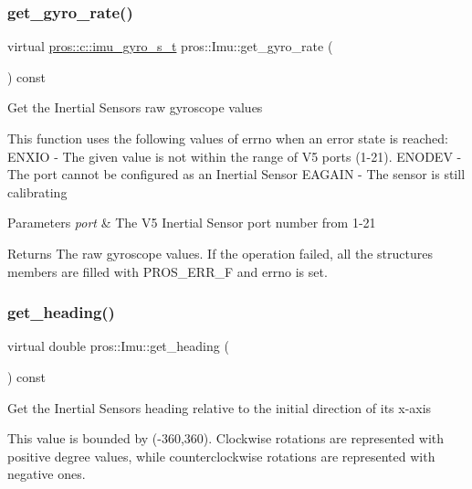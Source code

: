 \subsubsection{\texorpdfstring{get\+\_\+gyro\+\_\+rate()}{get\_gyro\_rate()}}
{\footnotesize\ttfamily virtual \hyperlink{imu_8h_a5b9e240cfb181cce3c741e29efbbbf23}{pros\+::c\+::imu\+\_\+gyro\+\_\+s\+\_\+t} pros\+::\+Imu\+::get\+\_\+gyro\+\_\+rate (\begin{DoxyParamCaption}{ }\end{DoxyParamCaption}) const\hspace{0.3cm}{\ttfamily [virtual]}}

Get the Inertial Sensor\textquotesingle{}s raw gyroscope values

This function uses the following values of errno when an error state is reached\+: E\+N\+X\+IO -\/ The given value is not within the range of V5 ports (1-\/21). E\+N\+O\+D\+EV -\/ The port cannot be configured as an Inertial Sensor E\+A\+G\+A\+IN -\/ The sensor is still calibrating


\begin{DoxyParams}{Parameters}
{\em port} & The V5 Inertial Sensor port number from 1-\/21 \\
\hline
\end{DoxyParams}
\begin{DoxyReturn}{Returns}
The raw gyroscope values. If the operation failed, all the structure\textquotesingle{}s members are filled with P\+R\+O\+S\+\_\+\+E\+R\+R\+\_\+F and errno is set. 
\end{DoxyReturn}
\mbox{\label{classpros_1_1Imu_a35c7953c5def3c034763af25c4dbebe3}} 
\subsubsection{\texorpdfstring{get\+\_\+heading()}{get\_heading()}}
{\footnotesize\ttfamily virtual double pros\+::\+Imu\+::get\+\_\+heading (\begin{DoxyParamCaption}{ }\end{DoxyParamCaption}) const\hspace{0.3cm}{\ttfamily [virtual]}}

Get the Inertial Sensor\textquotesingle{}s heading relative to the initial direction of its x-\/axis

This value is bounded by (-\/360,360). Clockwise rotations are represented with positive degree values, while counterclockwise rotations are represented with negative ones.

